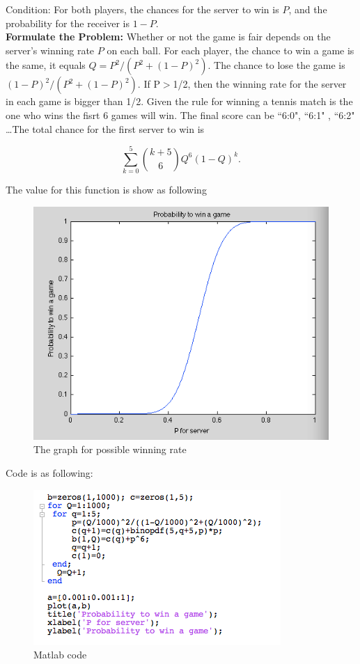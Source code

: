 \documentclass[12pt]{article}
\begin{document}
Condition: For both players, the chances for the server to win is $P$, and the probability for the receiver is $1-P$. \\

\noindent\textbf{Formulate the Problem:}  Whether or not the game is fair depends on the server's winning rate $P$ on each ball. For each player, the chance to win a game is the same, it equals $Q=P^2/(P^2+(1-P)^2)$. The chance to lose the game is $(1-P)^2/(P^2+(1-P)^2)$.  If P$>$1/2, then the winning rate for the server in each game is bigger than 1/2. Given the rule for winning a tennis match is the one who wins the fisrt 6 games will win. The final score can be ``6:0", ``6:1" , ``6:2" \ldots The total chance for the first server to win is 


\[
 \sum_{k=0}^{5} {k+5\choose 6}{Q^6(1-Q)^k.}
\]

\newpage
The value for this function is show as following 

\begin{figure}[h]
    \begin{center}
        \includegraphics[scale=0.6]{graph3.png}
    \end{center}
    \caption{The graph for possible winning rate}
    \label{fig:branch}
\end{figure}

Code is as following:
\begin{figure}[h]
    \begin{center}
        \includegraphics[scale=0.5]{code.png}
    \end{center}
    \caption{Matlab code}
    \label{fig:branch}
\end{figure}
\end{document}
